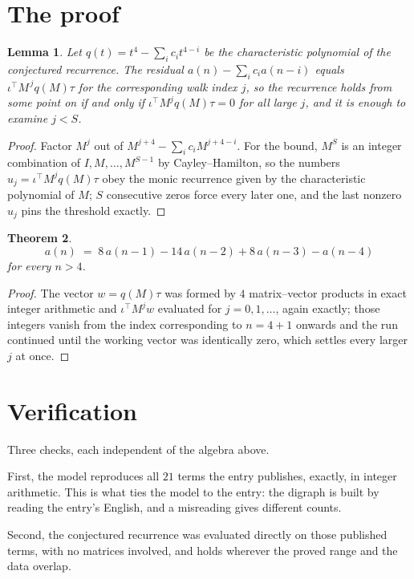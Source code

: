 \documentclass[11pt,a4paper]{article}
\theoremstyle{plain}
\newtheorem{theorem}{Theorem}
\newtheorem{lemma}[theorem]{Lemma}
\theoremstyle{definition}
\begin{document}
\section{The proof}

\begin{lemma}\label{lem:crit}
Let $q(t)=t^{4}-\sum_i c_it^{4-i}$ be the characteristic polynomial of the
conjectured recurrence. The residual $a(n)-\sum_ic_ia(n-i)$ equals
$\iota^{\!\top}M^{\,j}q(M)\tau$ for the corresponding walk index $j$, so the recurrence
holds from some point on if and only if $\iota^{\!\top}M^{j}q(M)\tau=0$ for all large $j$,
and it is enough to examine $j<S$.
\end{lemma}

\begin{proof}
Factor $M^{j}$ out of $M^{j+4}-\sum_ic_iM^{j+4-i}$. For the bound, $M^{S}$
is an integer combination of $I,M,\dots,M^{S-1}$ by Cayley--Hamilton, so the numbers
$u_j=\iota^{\!\top}M^{j}q(M)\tau$ obey the monic recurrence given by the characteristic
polynomial of $M$; $S$ consecutive zeros force every later one, and the last nonzero $u_j$
pins the threshold exactly.
\end{proof}

\begin{theorem}
\[
a(n)\;=\;8\,a(n-1) - 14\,a(n-2) + 8\,a(n-3) - a(n-4)
\]
for every $n>4$.
\end{theorem}

\begin{proof}
The vector $w=q(M)\tau$ was formed by $4$ matrix--vector products in exact integer
arithmetic and $\iota^{\!\top}M^{j}w$ evaluated for $j=0,1,\dots$, again exactly; those
integers vanish from the index corresponding to $n=4+1$ onwards and the run continued
until the working vector was identically zero, which settles every larger $j$ at once.
\end{proof}

\section{Verification}

Three checks, each independent of the algebra above.

First, the model reproduces all $21$ terms the entry publishes, exactly, in integer
arithmetic. This is what ties the model to the entry: the digraph is built by reading the
entry's English, and a misreading gives different counts.

Second, the conjectured recurrence was evaluated directly on those published terms, with no
matrices involved, and holds wherever the proved range and the data overlap.
\end{document}
